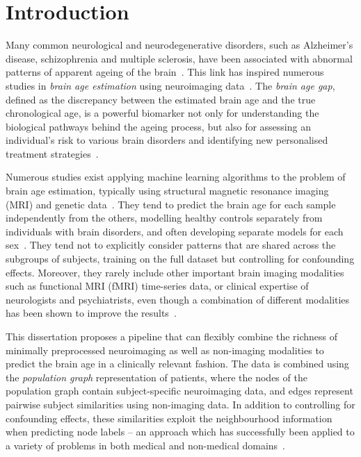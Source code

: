 \chapter{Introduction}



Many common neurological and neurodegenerative disorders, such as Alzheimer’s disease, schizophrenia and multiple sclerosis, have been associated with abnormal patterns of apparent ageing of the brain~\cite{kaufmann2019}. This link has inspired numerous studies in \textit{brain age estimation} using neuroimaging data~\cite{franke2019ten}. The \textit{brain age gap}, defined as the discrepancy between the estimated brain age and the true chronological age, is a powerful biomarker not only for understanding the biological pathways behind the ageing process, but also for assessing an individual’s risk to various brain disorders and identifying new personalised treatment strategies~\cite{tuncc2019deviation}.


Numerous studies exist applying machine learning algorithms to the problem of brain age estimation, typically using structural magnetic resonance imaging (MRI) and genetic data~\cite{franke2019ten}. They tend to predict the brain age for each sample independently from the others, modelling healthy controls separately from individuals with brain disorders, and often developing separate models for each sex~\cite{kaufmann2019,niu2019improved}. They tend not to explicitly consider patterns that are shared across the subgroups of subjects, training on the full dataset but controlling for confounding effects. Moreover, they rarely include other important brain imaging modalities such as functional MRI (fMRI) time-series data, or clinical expertise of neurologists and psychiatrists, even though a combination of different modalities has been shown to improve the results~\cite{niu2019improved}. 


This dissertation proposes a pipeline that can flexibly combine the richness of minimally preprocessed neuroimaging as well as non-imaging modalities to predict the brain age in a clinically relevant fashion. The data is combined using the \textit{population graph} representation of patients, where the nodes of the population graph contain subject-specific neuroimaging data, and edges represent pairwise subject similarities using non-imaging data. In addition to controlling for confounding effects, these similarities exploit the neighbourhood information when predicting node labels – an approach which has successfully been applied to a variety of problems in both medical and non-medical domains~\cite{parisot2018disease}. 


